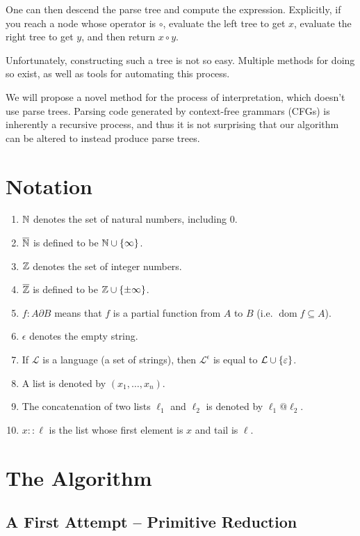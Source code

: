 \documentclass{llncs}
\newcounter{algo}
\begin{document}
One can then descend the parse tree and compute the expression.
Explicitly, if you reach a node whose operator is $\circ$, evaluate the left tree to get $x$, evaluate the right tree to get $y$, and then return $x\circ y$.

Unfortunately, constructing such a tree is not so easy.
Multiple methods for doing so exist, as well as tools for automating this process.

We will propose a novel method for the process of interpretation, which doesn't use parse trees.
Parsing code generated by context-free grammars (CFGs) is inherently a recursive process, and thus it is not surprising that our algorithm can be altered to instead produce parse trees.

\section{Notation}

\begin{enumerate}
    \item $\mathbb N$ denotes the set of natural numbers, including $0$.
    \item $\overline{\mathbb N}$ is defined to be $\bN\cup\set\infty$.
    \item $\mathbb Z$ denotes the set of integer numbers.
    \item $\overline{\mathbb Z}$ is defined to be $\bZ\cup\set{\pm\infty}$.
    \item $f\colon A\partial B$ means that $f$ is a partial function from $A$ to $B$ (i.e. $\operatorname{dom}f\subseteq A$).
    \item $\epsilon$ denotes the empty string.
    \item If $\mathcal L$ is a language (a set of strings), then $\mathcal L^\epsilon$ is equal to $\mathcal L\cup\set\epsilon$.
    \item A list is denoted by $(x_1,\dots,x_n)$.
    \item The concatenation of two lists $\ell_1$ and $\ell_2$ is denoted by $\ell_1@\ell_2$.
    \item $x::\ell$ is the list whose first element is $x$ and tail is $\ell$.
\end{enumerate}

\section{The Algorithm}

\subsection{A First Attempt -- Primitive Reduction}
\end{document}
